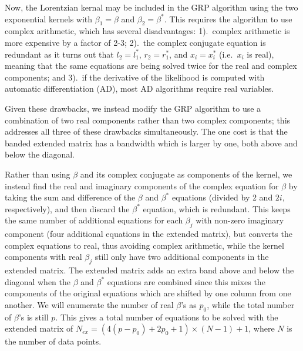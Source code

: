 \documentclass[manuscript, letterpaper]{aastex6}
\begin{document}
Now, the Lorentzian kernal may be included in the GRP algorithm
using the two exponential kernels with $\beta_1 = \beta$ and $\beta_2 = \beta^*$.  This
requires the algorithm to use complex arithmetic, which has several disadvantages:
1).\ complex arithmetic is more expensive by a factor of 2-3; 2).\ the complex conjugate equation
is redundant as it turns out that $l_2 = l_1^*$, $r_2 = r_1^*$, and $x_i = x_i^*$ (i.e.\ $x_i$ is
real), meaning that the same equations are being solved twice for the real and complex components;
and 3).\ if the derivative of the likelihood is computed with automatic
differentiation (AD), most AD algorithms require real variables.

Given these drawbacks, we instead modify the GRP algorithm to use a combination of two real
components rather than two complex components;  this addresses all three of these drawbacks
simultaneously.  The one cost is that the banded extended matrix has a bandwidth which is
larger by one, both above and below the diagonal.

Rather than using $\beta$ and its complex conjugate as components of the kernel, we instead
find the real and imaginary components of the complex equation for $\beta$ by taking the
sum and difference of the $\beta$ and $\beta^*$ equations (divided by 2 and $2i$, respectively),
and then discard the $\beta^*$ equation, which is redundant.  This keeps the same number of
additional equations for each $\beta_j$ with non-zero imaginary component (four additional
equations in the extended matrix), but converts the complex equations to real, thus avoiding
complex arithmetic, while the kernel components with real $\beta_j$ still only have two
additional components in the extended matrix.  The extended matrix adds an extra band above
and below the diagonal when the $\beta$ and $\beta^*$ equations are combined since this
mixes the components of the original equations which are shifted by one column from one
another.  We will enumerate the number of real $\beta$'s as $p_0$, while the total number
of $\beta$'s is still $p$.  This gives a total number of equations to be solved with the
extended matrix of $N_{ex}= (4(p-p_0)+2p_0+1)\times(N-1)+1$, where $N$ is the number of data
points.
\end{document}
